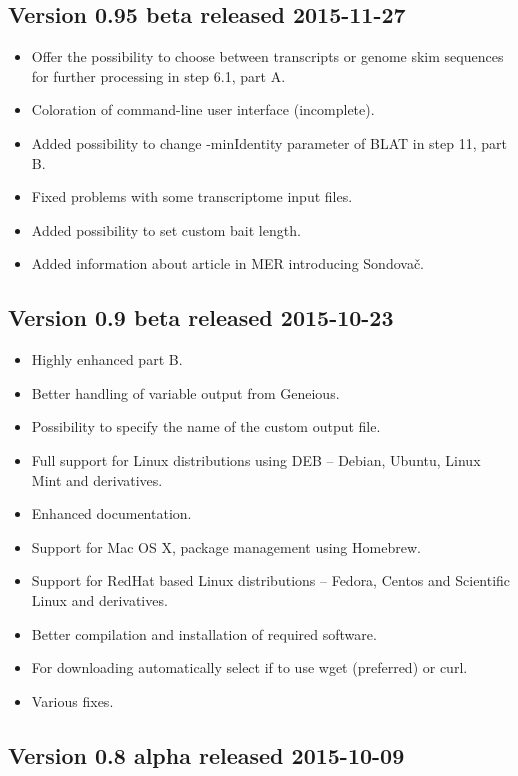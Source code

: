 \documentclass[a4paper, 11pt, twoside]{article}
\begin{document}
\subsection{Version 0.95 beta released 2015-11-27}

\begin{itemize}
  \item Offer the possibility to choose between transcripts or genome skim sequences for further processing in step 6.1, part A.
  \item Coloration of command-line user interface (incomplete).
  \item Added possibility to change -minIdentity parameter of BLAT in step 11, part B.
  \item Fixed problems with some transcriptome input files.
  \item Added possibility to set custom bait length.
  \item Added information about article in MER introducing Sondovač.
\end{itemize}

\subsection{Version 0.9 beta released 2015-10-23}

\begin{itemize}
  \item Highly enhanced part B.
  \item Better handling of variable output from Geneious.
  \item Possibility to specify the name of the custom output file.
  \item Full support for Linux distributions using DEB -- Debian, Ubuntu, Linux Mint and derivatives.
  \item Enhanced documentation.
  \item Support for Mac OS X, package management using Homebrew.
  \item Support for RedHat based Linux distributions -- Fedora, Centos and Scientific Linux and derivatives.
  \item Better compilation and installation of required software.
  \item For downloading automatically select if to use wget (preferred) or curl.
  \item Various fixes.
\end{itemize}

\subsection{Version 0.8 alpha released 2015-10-09}
\end{document}
